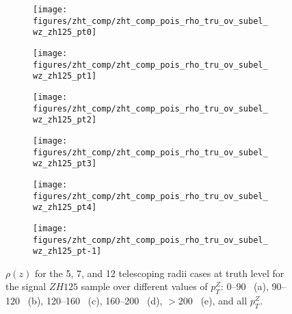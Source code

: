 \begin{figure}[!htbp]\captionsetup{justification=centering}
\begin{center}
\begin{subfigure}[t]{16pc}\centering\texttt{[image: figures/zht\_comp/zht\_comp\_pois\_rho\_tru\_ov\_subel\_wz\_zh125\_pt0]}\caption{}\end{subfigure}
\begin{subfigure}[t]{16pc}\centering\texttt{[image: figures/zht\_comp/zht\_comp\_pois\_rho\_tru\_ov\_subel\_wz\_zh125\_pt1]}\caption{}\end{subfigure}
\begin{subfigure}[t]{16pc}\centering\texttt{[image: figures/zht\_comp/zht\_comp\_pois\_rho\_tru\_ov\_subel\_wz\_zh125\_pt2]}\caption{}\end{subfigure}
\begin{subfigure}[t]{16pc}\centering\texttt{[image: figures/zht\_comp/zht\_comp\_pois\_rho\_tru\_ov\_subel\_wz\_zh125\_pt3]}\caption{}\end{subfigure}
\begin{subfigure}[t]{16pc}\centering\texttt{[image: figures/zht\_comp/zht\_comp\_pois\_rho\_tru\_ov\_subel\_wz\_zh125\_pt4]}\caption{}\end{subfigure}
\begin{subfigure}[t]{16pc}\centering\texttt{[image: figures/zht\_comp/zht\_comp\_pois\_rho\_tru\_ov\_subel\_wz\_zh125\_pt-1]}\caption{}\end{subfigure}
\caption{\label{fig:comprhozh125tru} $\rho\left(z\right)$ for the 5, 7, and 12 telescoping radii cases at truth level for the signal $ZH125$ sample over different values of $p_T^Z$: 0--90 \GeV\ (a), 90--120 \GeV\ (b), 120--160 \GeV\ (c), 160--200 \GeV\ (d), $>200$ \GeV\ (e), and all $p_T^Z$.}
\end{center}
\end{figure}
\clearpage
